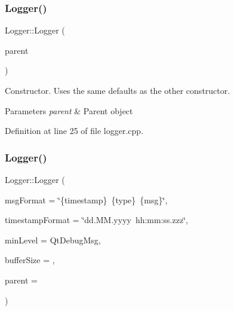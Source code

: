 \subsubsection{\texorpdfstring{Logger()}{Logger()}\hspace{0.1cm}{\footnotesize\ttfamily [1/2]}}
{\footnotesize\ttfamily Logger\+::\+Logger (\begin{DoxyParamCaption}\item[{Q\+Object $\ast$}]{parent }\end{DoxyParamCaption})}

Constructor. Uses the same defaults as the other constructor. 
\begin{DoxyParams}{Parameters}
{\em parent} & Parent object \\
\hline
\end{DoxyParams}


Definition at line 25 of file logger.\+cpp.

\mbox{\label{classstefanfrings_1_1_logger_a19e368e5763fed782f90588f277877fb}} 
\subsubsection{\texorpdfstring{Logger()}{Logger()}\hspace{0.1cm}{\footnotesize\ttfamily [2/2]}}
{\footnotesize\ttfamily Logger\+::\+Logger (\begin{DoxyParamCaption}\item[{const Q\+String}]{msg\+Format = {\ttfamily \char`\"{}\{timestamp\}~\{type\}~\{msg\}\char`\"{}},  }\item[{const Q\+String}]{timestamp\+Format = {\ttfamily \char`\"{}dd.MM.yyyy~hh\+:mm\+:ss.zzz\char`\"{}},  }\item[{const Qt\+Msg\+Type}]{min\+Level = {\ttfamily QtDebugMsg},  }\item[{const int}]{buffer\+Size = {},  }\item[{Q\+Object $\ast$}]{parent = {} }\end{DoxyParamCaption})}

